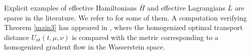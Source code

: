\documentclass[reqno,11pt]{amsart}
\numberwithin{equation}{section}
\newcommand{\zd}[1]{{\color{brown}[ZD:#1]}}
\newcommand{\e}{\varepsilon}
\newcommand{\nd}{\noindent}
\begin{document}

\vspace{1.5mm}

\nd
Explicit examples of effective Hamiltonians $\overline{H}$ and effective Lagrangians $\overline{L}$ are sparse in the literature. We refer to \cite[Section 4]{tran_hamilton-jacobi_2021} for some of them. A computation verifying Theorem \ref{main3} has appeared in \cite[Section 5.2]{Gao_Yip_2025}, where the homogenized optimal transport distance $U_{ot}(t,\mu,\nu)$ is compared with the metric corresponding to a homogenized gradient flow in the Wasserstein space.
\vspace{0.5mm}

\vspace{-3mm}
\end{document}
